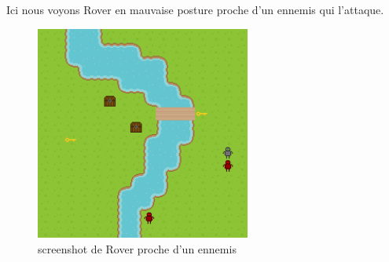 \documentclass[a4paper 12pts]{article}
\begin{document}
\newpage


Ici nous voyons Rover en mauvaise posture proche d'un ennemis qui l'attaque.

\vspace{1cm}

\begin{figure}[h]   
	\includegraphics[width=200pt]{Illustration/screens/screen3.png}
\caption{screenshot de Rover proche d'un ennemis}
\end{figure}
\end{document}
